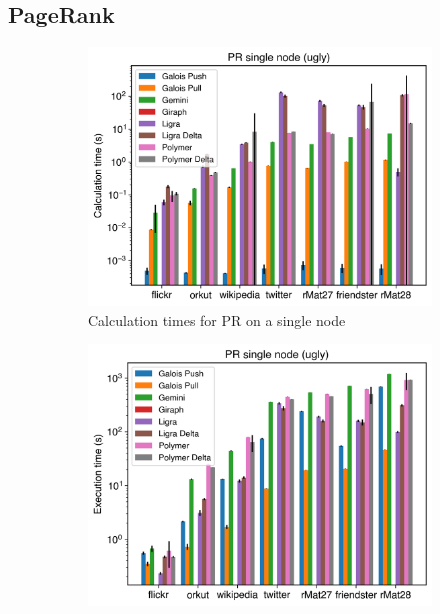 

\subsection{PageRank}

\begin{figure}
	\begin{subfigure}{0.3\textwidth}
		\includegraphics[width=\linewidth]{../../plots/singleNodePR_calcTime.png}
		\caption{Calculation times for PR on a single node}
		\label{fig:singleNodePR_calc}
	\end{subfigure}
	\hfil
	\begin{subfigure}{0.3\textwidth}
		\includegraphics[width=\linewidth]{../../plots/singleNodePR_execTime.png}

\end{subfigure}
\end{figure}
